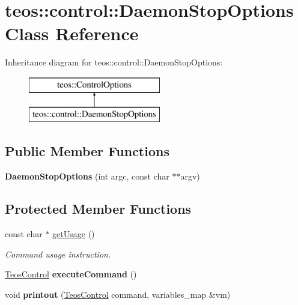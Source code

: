 \hypertarget{classteos_1_1control_1_1_daemon_stop_options}{}\section{teos\+:\+:control\+:\+:Daemon\+Stop\+Options Class Reference}
\label{classteos_1_1control_1_1_daemon_stop_options}
Inheritance diagram for teos\+:\+:control\+:\+:Daemon\+Stop\+Options\+:\begin{figure}[H]
\begin{center}
\leavevmode
\includegraphics[height=2.000000cm]{classteos_1_1control_1_1_daemon_stop_options}
\end{center}
\end{figure}
\subsection*{Public Member Functions}
\begin{DoxyCompactItemize}
\item 
\mbox{\label{classteos_1_1control_1_1_daemon_stop_options_a518c6d0d85866b13aae28500da7637bb}} 
{\bfseries Daemon\+Stop\+Options} (int argc, const char $\ast$$\ast$argv)
\end{DoxyCompactItemize}
\subsection*{Protected Member Functions}
\begin{DoxyCompactItemize}
\item 
const char $\ast$ \mbox{\hyperlink{classteos_1_1control_1_1_daemon_stop_options_a99e7d5a47cd20e4ad437049263cd367a}{get\+Usage}} ()
\begin{DoxyCompactList}\small\item\em Command \textquotesingle{}usage\textquotesingle{} instruction. \end{DoxyCompactList}\item 
\mbox{\label{classteos_1_1control_1_1_daemon_stop_options_afb91935bea6f426383c3b88d035fe03c}} 
\mbox{\hyperlink{classteos_1_1_teos_control}{Teos\+Control}} {\bfseries execute\+Command} ()
\item 
\mbox{\label{classteos_1_1control_1_1_daemon_stop_options_af7e6dac1e8dfd8750f8101e6b48b4912}} 
void {\bfseries printout} (\mbox{\hyperlink{classteos_1_1_teos_control}{Teos\+Control}} command, variables\+\_\+map \&vm)
\end{DoxyCompactItemize}
